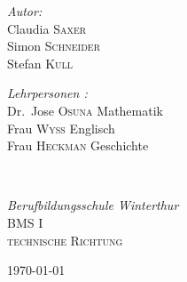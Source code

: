 \begin{titlepage}
\begin{center}
\begin{minipage}{0.4\textwidth}
\begin{flushleft} \large
\emph{Autor:}
\\Claudia \textsc{Saxer}
\\Simon \textsc{Schneider}
\\Stefan \textsc{Kull}
\end{flushleft}
\end{minipage}
\begin{minipage}{0.5\textwidth}
\begin{flushright} \large
\emph{Lehrpersonen :} 
\\Dr.~Jose \textsc{Osuna}  \textnormal{Mathematik}
\\Frau \textsc{Wyss} \textnormal{Englisch}
\\Frau \textsc{Heckman} \textnormal{Geschichte}
\end{flushright}
\end{minipage}
\\[1.5cm]
\begin{minipage}{0.5\textwidth}
\begin{center} \large
\emph{Berufbildungsschule Winterthur}  
\\ \textsc{BMS I}
\\ \textsc{technische Richtung }
\end{center}
\end{minipage}

\vfill

{\large \today}

\end{center}


\end{titlepage}


